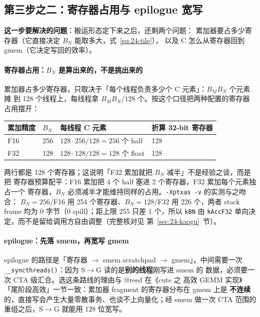 \subsection{第三步之二：寄存器占用与 epilogue 宽写}\label{sec:24-step3b}

\textbf{这一步要解决的问题}：搬运形态定下来之后，还剩两个问题：
累加器要占多少寄存器（它直接决定 $B_N$ 能取多大，式~\eqref{eq:24-tile}），
以及 C 怎么从寄存器回到 gmem（它决定写回的效率）。

\paragraph{寄存器占用：$B_N$ 是算出来的，不是挑出来的}

累加器占多少寄存器，只取决于「每个线程负责多少个 C 元素」：$B_M B_N$ 个元素摊
到 128 个线程上，每线程拿 $B_M B_N/128$ 个。按这个口径把两种配置的寄存器占用摆开：

\begin{center}
\begin{tabular}{llll}
\toprule
累加精度 & $B_N$ & 每线程 C 元素 & 折算 32-bit 寄存器 \\
\midrule
F16 & 256 & $128\cdot256/128=256$ 个 half & 128 \\
F32 & 128 & $128\cdot128/128=128$ 个 float & 128 \\
\bottomrule
\end{tabular}
\end{center}

两行都是 128 个寄存器；这说明「F32 累加就把 $B_N$ 减半」不是经验之谈，而是把
寄存器预算配平：F16 累加把 4 个 half 塞进 2 个寄存器，F32 累加每个元素独占一个
寄存器，$B_N$ 必须减半才能维持同样的占用。\texttt{-Xptxas -v} 的实测与之吻合：
$B_N{=}256$/F16 用 254 个寄存器、$B_N{=}128$/F32 用 226 个，两者 stack frame
均为 0 字节（0 spill）；距上限 255 只差 1 个，所以 \texttt{kBN} 由
\texttt{kAccF32} 单向决定，而不是留给调用方自由调整（完整核对见
第~\ref{sec:24-kaogu}~节）。

\paragraph{epilogue：先落 smem，再宽写 gmem}

epilogue 的路径是「寄存器 $\to$ smem scratchpad $\to$ gmem」，中间需要一次
\texttt{\_\allowbreak{}\_\allowbreak{}syncthreads\allowbreak{}()}：因为 S$\to$G 读的是\textbf{别的线程}刚写进 smem 的
数据，必须要一次 CTA 级汇合。选这条路线的理由与 @reed 在《cute 之 高效 GEMM
实现》「尾阶段高效」一节一致：累加器 fragment 的寄存器分布在 gmem 上是
\textbf{不连续}的，直接写会产生大量零散事务、也谈不上向量化；经 smem 做一次
CTA 范围的重组之后，S$\to$G 就能用 128 位宽写。

